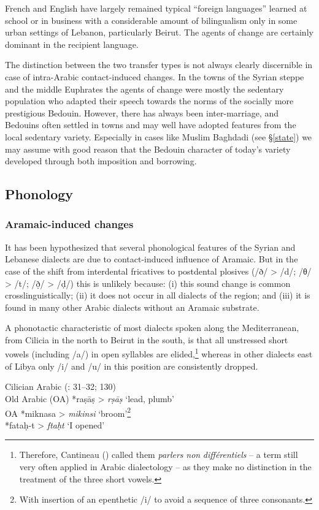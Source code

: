 \documentclass[output=paper]{langsci/langscibook}
\begin{document}
French and English have largely remained typical “foreign languages” learned at school or in business with a considerable amount of bilingualism only in some urban settings of Lebanon, particularly Beirut. The agents of change are certainly dominant in the recipient language. 

The distinction between the two transfer types is not always clearly discernible in case of intra-Arabic contact-induced changes. In the towns of the Syrian steppe and the middle Euphrates the agents of change were mostly the sedentary population who adapted their speech towards the norms of the socially more prestigious Bedouin. However, there has always been inter-marriage, and Bedouins often settled in towns and may well have adopted features from the local sedentary variety. Especially in cases like Muslim Baghdadi (see §\ref{state}) we may assume with good reason that the Bedouin character of today’s variety developed through both imposition and borrowing. 

  \subsection{Phonology} 
 \subsubsection{Aramaic-induced changes} 

It has been hypothesized that several phonological features of the Syrian and Lebanese dialects are due to contact-induced influence of Aramaic. But in the case of the shift from interdental fricatives to postdental plosives (/ð/ > /d/; /θ/ > /t/; /ð̣/ > /ḍ/) this is unlikely because: (i) this sound change is common crosslinguistically; (ii) it does not occur in all dialects of the region; and (iii) it is found in many other Arabic dialects without an Aramaic substrate. 

A phonotactic characteristic of most dialects spoken along the Mediterranean, from Cilicia in the north to Beirut in the south, is that all unstressed short vowels (including /a/) in open syllables are elided,\footnote{Therefore, Cantineau (\citeyear[108]{Cantineau1960book}) called them \textit{parlers} \textit{non} \textit{différentiels} – a term still very often applied in Arabic dialectology – as they make no distinction in the treatment of the three short vowels.} whereas in other dialects east of Libya only /i/ and /u/ in this position are consistently dropped.

\ea
{Cilician Arabic (\citealt{Procházka2002Cukurova}: 31--32; 130)}\\
  \textup{Old Arabic (OA)} *raṣāṣ > \textit{rṣāṣ}  \textup{‘lead, plumb’\\
OA} *miknasa > \textit{mikinsi} ‘\textup{broom’}\footnote{With insertion of an epenthetic /i/ to avoid a sequence of three consonants.}\\
*fataḥ-t > \textit{ftaḥt} ‘\textup{I opened’}\\
  \z
  
\end{document}

